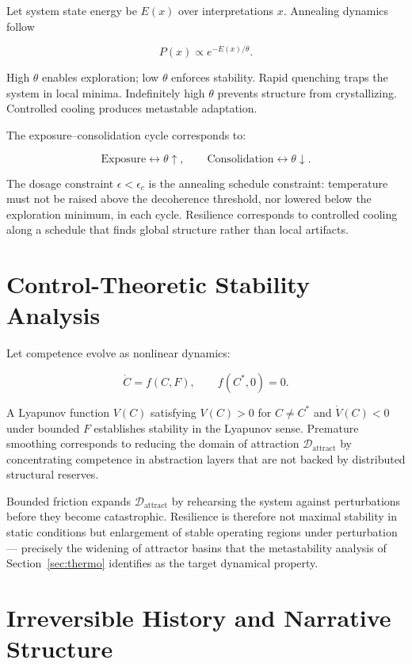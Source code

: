 \documentclass[11pt]{article}
\theoremstyle{remark}
\begin{document}
Let system state energy be $E(x)$ over interpretations $x$. Annealing dynamics follow

\[
P(x) \propto e^{-E(x)/\theta}.
\]

High $\theta$ enables exploration; low $\theta$ enforces stability. Rapid quenching traps the system in local minima. Indefinitely high $\theta$ prevents structure from crystallizing. Controlled cooling produces metastable adaptation.

The exposure--consolidation cycle corresponds to:

\[
\text{Exposure} \leftrightarrow \theta \uparrow, \qquad \text{Consolidation} \leftrightarrow \theta \downarrow.
\]

The dosage constraint $\epsilon < \epsilon_c$ is the annealing schedule constraint: temperature must not be raised above the decoherence threshold, nor lowered below the exploration minimum, in each cycle. Resilience corresponds to controlled cooling along a schedule that finds global structure rather than local artifacts.

\section{Control-Theoretic Stability Analysis}
\label{app:control}

Let competence evolve as nonlinear dynamics:

\[
\dot{C} = f(C, F), \qquad f(C^*, 0) = 0.
\]

A Lyapunov function $V(C)$ satisfying $V(C) > 0$ for $C \neq C^*$ and $\dot{V}(C) < 0$ under bounded $F$ establishes stability in the Lyapunov sense. Premature smoothing corresponds to reducing the domain of attraction $\mathcal{D}_{\text{attract}}$ by concentrating competence in abstraction layers that are not backed by distributed structural reserves.

Bounded friction expands $\mathcal{D}_{\text{attract}}$ by rehearsing the system against perturbations before they become catastrophic. Resilience is therefore not maximal stability in static conditions but enlargement of stable operating regions under perturbation — precisely the widening of attractor basins that the metastability analysis of Section~\ref{sec:thermo} identifies as the target dynamical property.

\section{Irreversible History and Narrative Structure}
\label{app:narrative}
\end{document}
